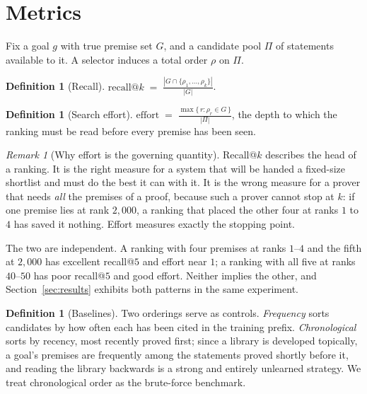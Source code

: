 \documentclass[11pt]{article}
\theoremstyle{plain}
\theoremstyle{definition}
\newtheorem{definition}[theorem]{Definition}
\theoremstyle{remark}
\newtheorem{remark}[theorem]{Remark}
\begin{document}
\section{Metrics}\label{sec:metrics}

Fix a goal $g$ with true premise set $G$, and a candidate pool $\Pi$ of
statements available to it. A selector induces a total order $\rho$ on $\Pi$.

\begin{definition}[Recall]\label{def:recall}
$\displaystyle \mathrm{recall}@k \;=\; \frac{|G\cap\{\rho_1,\dots,\rho_k\}|}{|G|}$.
\end{definition}

\begin{definition}[Search effort]\label{def:effort}
$\displaystyle \mathrm{effort} \;=\; \frac{\max\{\,r : \rho_r\in G\,\}}{|\Pi|}$,
the depth to which the ranking must be read before every premise has been seen.
\end{definition}

\begin{remark}[Why effort is the governing quantity]\label{rem:whyeffort}
Recall@$k$ describes the head of a ranking. It is the right measure for a system
that will be handed a fixed-size shortlist and must do the best it can with it.
It is the wrong measure for a prover that needs \emph{all} the premises of a
proof, because such a prover cannot stop at $k$: if one premise lies at rank
$2{,}000$, a ranking that placed the other four at ranks $1$ to $4$ has saved it
nothing. Effort measures exactly the stopping point.

The two are independent. A ranking with four premises at ranks $1$--$4$ and the
fifth at $2{,}000$ has excellent recall@$5$ and effort near $1$; a ranking with
all five at ranks $40$--$50$ has poor recall@$5$ and good effort. Neither implies
the other, and Section~\ref{sec:results} exhibits both patterns in the same
experiment.
\end{remark}

\begin{definition}[Baselines]\label{def:baselines}
Two orderings serve as controls. \emph{Frequency} sorts candidates by how often
each has been cited in the training prefix. \emph{Chronological} sorts by
recency, most recently proved first; since a library is developed topically, a
goal's premises are frequently among the statements proved shortly before it,
and reading the library backwards is a strong and entirely unlearned strategy.
We treat chronological order as the brute-force benchmark.
\end{definition}
\end{document}
